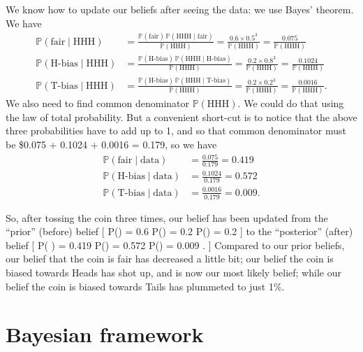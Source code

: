 \documentclass[
  letterpaper,
]{report}
\theoremstyle{definition}
\theoremstyle{definition}
\theoremstyle{remark}
\begin{document}
We know how to update our beliefs after seeing the data: we use Bayes'
theorem. We have \begin{align*}
\mathbb P(\text{fair} \mid \text{HHH}) &= \frac{\mathbb P(\text{fair})\, \mathbb P(\text{HHH}\mid \text{fair})}{\mathbb P(\text{HHH})} = \frac{0.6 \times 0.5^3}{\mathbb P(\text{HHH})} = \frac{0.075}{\mathbb P(\text{HHH})} \\
\mathbb P(\text{H-bias} \mid \text{HHH}) &= \frac{\mathbb P(\text{H-bias})\, \mathbb P(\text{HHH}\mid \text{H-bias})}{\mathbb P(\text{HHH})} = \frac{0.2 \times 0.8^3}{\mathbb P(\text{HHH})} = \frac{0.1024}{\mathbb P(\text{HHH})} \\
\mathbb P(\text{T-bias} \mid \text{HHH}) &= \frac{\mathbb P(\text{H-bias})\, \mathbb P(\text{HHH}\mid \text{T-bias})}{\mathbb P(\text{HHH})} = \frac{0.2 \times 0.2^3}{\mathbb P(\text{HHH})} = \frac{0.0016}{\mathbb P(\text{HHH})}  .
\end{align*} We also need to find common denominator
\(\mathbb P(\text{HHH})\). We could do that using the law of total
probability. But a convenient short-cut is to notice that the above
three probabilities have to add up to 1, and so that common denominator
must be \$0.075 + 0.1024 + 0.0016 = 0.179, so we have \begin{align*}
  \mathbb P(\text{fair} \mid \text{data}) &= \frac{0.075}{0.179} = 0.419 \\
  \mathbb P(\text{H-bias}\mid \text{data}) &= \frac{0.1024}{0.179} = 0.572 \\
  \mathbb P(\text{T-bias}\mid \text{data}) &= \frac{0.0016}{0.179} = 0.009 .
\end{align*}

So, after tossing the coin three times, our belief has been updated from
the ``prior'' (before) belief {[} \mathbb P() = 0.6
\qquad \mathbb P() = 0.2 \qquad \mathbb P() =
0.2 {]} to the ``posterior'' (after) belief {[} \mathbb P(
\mid {}) = 0.419
\qquad \mathbb P(\mid {}) = 0.572
\qquad \mathbb P(\mid {}) = 0.009 . {]} Compared
to our prior beliefs, our belief that the coin is fair has decreased a
little bit; our belief the coin is biased towards Heads has shot up, and
is now our most likely belief; while our belief the coin is biased
towards Tails has plummeted to just 1\%.

\hypertarget{bayesian-framework}{%
\section{Bayesian framework}\label{bayesian-framework}}
\end{document}
